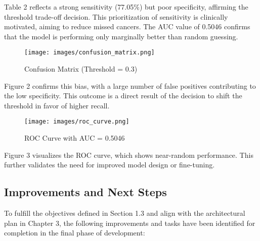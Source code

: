 \documentclass[12pt]{article}
\begin{document}
Table 2 reflects a strong sensitivity (77.05\%) but poor specificity, affirming the threshold trade-off decision. This prioritization of sensitivity is clinically motivated, aiming to reduce missed cancers. The AUC value of 0.5046 confirms that the model is performing only marginally better than random guessing.

\begin{figure}[H]
\centering
\texttt{[image: images/confusion\_matrix.png]}
\caption{Confusion Matrix (Threshold = 0.3)}
\end{figure}
Figure 2 confirms this bias, with a large number of false positives contributing to the low specificity. This outcome is a direct result of the decision to shift the threshold in favor of higher recall.

\begin{figure}[H]
\centering
\texttt{[image: images/roc\_curve.png]}
\caption{ROC Curve with AUC = 0.5046}
\end{figure}
Figure 3 visualizes the ROC curve, which shows near-random performance. This further validates the need for improved model design or fine-tuning.

\subsection{Improvements and Next Steps}
To fulfill the objectives defined in Section 1.3 and align with the architectural plan in Chapter 3, the following improvements and tasks have been identified for completion in the final phase of development:
\end{document}
